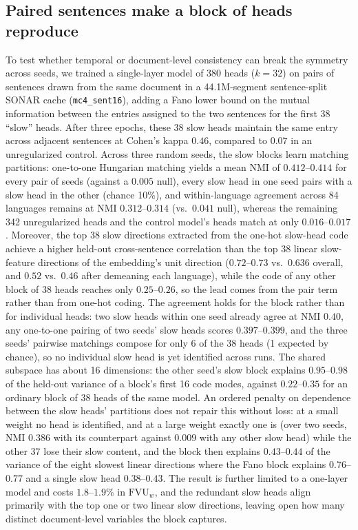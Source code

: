 \subsection{Paired sentences make a block of heads reproduce}
\label{sec:prelim-slow}
To test whether temporal or document-level consistency can break the
symmetry across seeds, we trained a single-layer model of 380 heads
($k{=}32$) on pairs of sentences drawn from the same document in a
44.1M-segment sentence-split SONAR cache (\texttt{mc4\_sent16}), adding a
Fano lower bound on the mutual information between the entries assigned
to the two sentences for the first 38 ``slow'' heads. After three epochs,
these 38 slow heads maintain the same entry across adjacent sentences at
Cohen's kappa $0.46$, compared to $0.07$ in an unregularized control.
Across three random seeds, the slow blocks learn matching partitions:
one-to-one Hungarian matching yields a mean NMI of $0.412$--$0.414$ for
every pair of seeds (against a $0.005$ null), every slow head in one seed
pairs with a slow head in the other (chance 10\%), and within-language
agreement across 84 languages remains at NMI $0.312$--$0.314$ (vs.\
$0.041$ null), whereas the remaining 342 unregularized heads and the
control model's heads match at only $0.016$--$0.017$. Moreover, the top 38 slow directions extracted from the
one-hot slow-head code achieve a higher held-out cross-sentence
correlation than the top 38 linear slow-feature directions of the
embedding's unit direction ($0.72$--$0.73$ vs.\ $0.636$ overall, and $0.52$ vs.\ $0.46$
after demeaning each language), while the code of any other block of 38
heads reaches only $0.25$--$0.26$, so the lead comes from the pair term
rather than from one-hot coding. The agreement holds for the block rather
than for individual heads: two slow heads within one seed already agree
at NMI $0.40$, any one-to-one pairing of two seeds' slow heads scores
$0.397$--$0.399$, and the three seeds' pairwise matchings compose for only
6 of the 38 heads (1 expected by chance), so no individual slow head is
yet identified across runs. The shared subspace has about 16 dimensions:
the other seed's slow block explains $0.95$--$0.98$ of the held-out
variance of a block's first 16 code modes, against $0.22$--$0.35$ for an
ordinary block of 38 heads of the same model. An ordered penalty on dependence between the
slow heads' partitions does not repair this without loss: at a small
weight no head is identified, and at a large weight exactly one is (over
two seeds, NMI $0.386$ with its counterpart against $0.009$ with any
other slow head) while the other 37 lose their slow content, and the
block then explains $0.43$--$0.44$ of the variance of the eight slowest
linear directions where the Fano block explains $0.76$--$0.77$ and a
single slow head $0.38$--$0.43$. The result is further limited to a one-layer
model and costs $1.8$--$1.9\%$ in $\mathrm{FVU}_w$, and the redundant slow
heads align primarily with the top one or two linear slow directions,
leaving open how many distinct document-level variables the block
captures.

